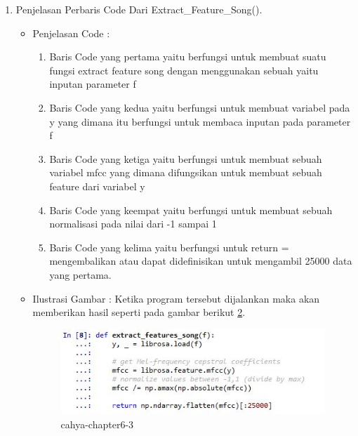 \begin{enumerate}
\begin{itemize}
\begin{figure}[!hbtp]
\caption{Cahya-chapter6-2-2}
\label{cahya-chapter6-2-2}
\end{figure}
\par
\end{itemize}
\par
\par
\par
\par
\par
\item Penjelasan Perbaris Code Dari Extract\_Feature\_Song().
\begin{itemize}
\item Penjelasan Code :
\begin{enumerate}
\item Baris Code yang pertama yaitu berfungsi untuk membuat suatu fungsi extract feature song dengan menggunakan sebuah yaitu inputan parameter f
\item Baris Code yang kedua yaitu berfungsi untuk membuat variabel pada y yang dimana itu berfungsi untuk membaca inputan pada parameter f 
\item Baris Code yang ketiga yaitu berfungsi untuk membuat sebuah variabel mfcc yang dimana difungsikan untuk membuat sebuah feature dari variabel y
\item Baris Code yang keempat yaitu berfungsi untuk membuat sebuah normalisasi pada nilai dari -1 sampai 1 
\item Baris Code yang kelima yaitu berfungsi untuk return = mengembalikan atau dapat didefinisikan untuk mengambil 25000 data yang pertama.
\end{enumerate}
\par
\item Ilustrasi Gambar : Ketika program tersebut dijalankan maka akan memberikan hasil seperti pada gambar berikut \ref{cahya-chapter6-3}.
\par
\begin{figure}[!hbtp]
\centering
\includegraphics[scale=0.2]{figures/cahya-chapter6-3.jpg}
\caption{cahya-chapter6-3}
\label{cahya-chapter6-3}
\end{figure}
\par

\end{itemize}
\end{enumerate}
